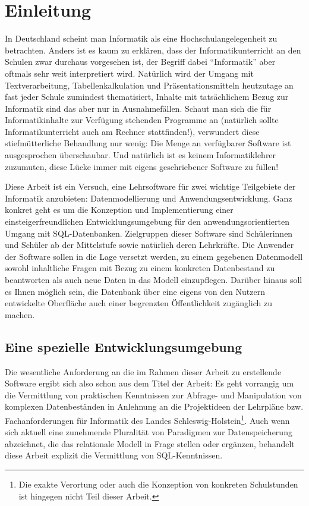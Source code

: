 \section{Einleitung}

In Deutschland scheint man Informatik als eine Hochschulangelegenheit zu betrachten. Anders ist es kaum zu erklären, dass der Informatikunterricht an den Schulen zwar durchaus vorgesehen ist, der Begriff dabei ``Informatik'' aber oftmals sehr weit interpretiert wird. Natürlich wird der Umgang mit Textverarbeitung, Tabellenkalkulation und Präsentationsmitteln heutzutage an fast jeder Schule zumindest thematisiert, Inhalte mit tatsächlichem Bezug zur Informatik sind das aber nur in Ausnahmefällen. Schaut man sich die für Informatikinhalte zur Verfügung stehenden Programme an (natürlich sollte Informatikunterricht auch am Rechner stattfinden!), verwundert diese stiefmütterliche Behandlung nur wenig: Die Menge an verfügbarer Software ist ausgesprochen überschaubar. Und natürlich ist es keinem Informatiklehrer zuzumuten, diese Lücke immer mit eigens geschriebener Software zu füllen!

Diese Arbeit ist ein Versuch, eine Lehrsoftware für zwei wichtige Teilgebiete der Informatik anzubieten: Datenmodellierung und Anwendungsentwicklung. Ganz konkret geht es um die Konzeption und Implementierung einer einsteigerfreundlichen Entwicklungsumgebung für den anwendungsorientierten Umgang mit SQL-Datenbanken. Zielgruppen dieser Software sind Schülerinnen und Schüler ab der Mittelstufe sowie natürlich deren Lehrkräfte. Die Anwender der Software sollen in die Lage versetzt werden, zu einem gegebenen Datenmodell sowohl inhaltliche Fragen mit Bezug zu einem konkreten Datenbestand zu beantworten als auch neue Daten in das Modell einzupflegen. Darüber hinaus soll es Ihnen möglich sein, die Datenbank über eine eigens von den Nutzern entwickelte Oberfläche auch einer begrenzten Öffentlichkeit zugänglich zu machen.

\subsection{Eine spezielle Entwicklungsumgebung}

Die wesentliche Anforderung an die im Rahmen dieser Arbeit zu erstellende Software ergibt sich also schon aus dem Titel der Arbeit: Es geht vorrangig um die Vermittlung von praktischen Kenntnissen zur Abfrage- und Manipulation von komplexen Datenbeständen in Anlehnung an die Projektideen der Lehrpläne \cite{lehrplan-inf-sek-1} bzw. Fachanforderungen \cite{lehrplan-inf-sek-2} für Informatik des Landes Schleswig-Holstein\footnote{Die exakte Verortung oder auch die Konzeption von konkreten Schulstunden ist hingegen nicht Teil dieser Arbeit.}. Auch wenn sich aktuell eine zunehmende Pluralität von Paradigmen zur Datenspeicherung abzeichnet, die das relationale Modell in Frage stellen oder ergänzen, behandelt diese Arbeit explizit die Vermittlung von SQL-Kenntnissen. 

